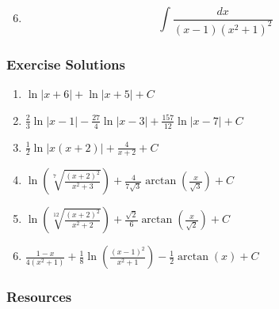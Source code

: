 \begin{enumerate}
\setcounter{enumi}{5}

\item 
\[
\int \frac{dx}{(x-1)(x^2+1)^2}
\]

\end{enumerate}

\subsubsection{Exercise Solutions}
\label{sss:exer-eab6}

\begin{enumerate}

\item $\ln|x+6| + \ln|x+5| + C$

\item $\tfrac{2}{3}\ln|x-1| - \tfrac{27}{4}\ln|x-3| + \tfrac{157}{12}\ln|x-7| + C$

\item $\tfrac{1}{2}\ln|x(x+2)| + \frac{4}{x+2} + C$

\item $\ln\!\left(\sqrt[7]{\frac{(x+2)^2}{x^2+3}}\right)
+ \frac{4}{7\sqrt{3}} \arctan\!\left(\frac{x}{\sqrt{3}}\right) + C$

\item $\ln\!\left(\sqrt[12]{\frac{(x+2)^2}{x^2+2}}\right)
+ \frac{\sqrt{2}}{6} \arctan\!\left(\frac{x}{\sqrt{2}}\right) + C$

\item $\frac{1-x}{4(x^2+1)} + \tfrac{1}{8}\ln\!\left(\frac{(x-1)^2}{x^2+1}\right)
- \frac{1}{2}\arctan(x) + C$

\end{enumerate}

\subsubsection{Resources}
\label{sss:reso-55b5}

